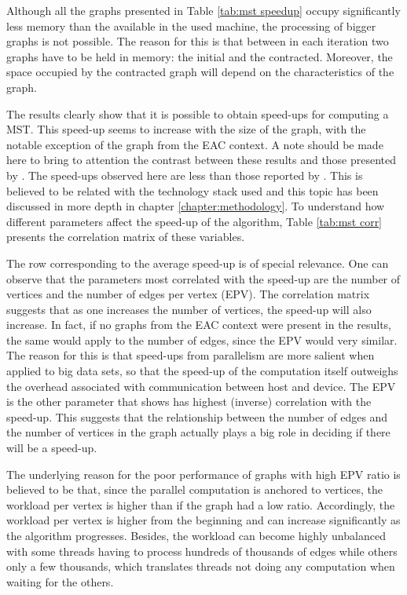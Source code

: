 Although all the graphs presented in Table \ref{tab:mst speedup} occupy significantly less memory than the available in the used machine, the processing of bigger graphs is not possible.
The reason for this is that between in each iteration two graphs have to be held in memory: the initial and the contracted.
Moreover, the space occupied by the contracted graph will depend on the characteristics of the graph.

The results clearly show that it is possible to obtain speed-ups for computing a MST.
This speed-up seems to increase with the size of the graph, with the notable exception of the graph from the EAC context.
A note should be made here to bring to attention the contrast between these results and those presented by \citet{Sousa2015}.
The speed-ups observed here are less than those reported by \citet{Sousa2015}.
This is believed to be related with the technology stack used and this topic has been discussed in more depth in chapter \ref{chapter:methodology}.
To understand how different parameters affect the speed-up of the algorithm, Table \ref{tab:mst corr} presents the correlation matrix of these variables.



The row corresponding to the average speed-up is of special relevance.
One can observe that the parameters most correlated with the speed-up are the number of vertices and the number of edges per vertex (EPV).
The correlation matrix suggests that as one increases the number of vertices, the speed-up will also increase.
In fact, if no graphs from the EAC context were present in the results, the same would apply to the number of edges, since the EPV would very similar.
The reason for this is that speed-ups from parallelism are more salient when applied to big data sets, so that the speed-up of the computation itself outweighs the overhead associated with communication between host and device.
The EPV is the other parameter that shows has highest (inverse) correlation with the speed-up.
This suggests that the relationship between the number of edges and the number of vertices in the graph actually plays a big role in deciding if there will be a speed-up.

The underlying reason for the poor performance of graphs with high EPV ratio is believed to be that, since the parallel computation is anchored to vertices, the workload per vertex is higher than if the graph had a low ratio.
Accordingly, the workload per vertex is higher from the beginning and can increase significantly as the algorithm progresses.
Besides, the workload can become highly unbalanced with some threads having to process hundreds of thousands of edges while others only a few thousands, which translates threads not doing any computation when waiting for the others.

